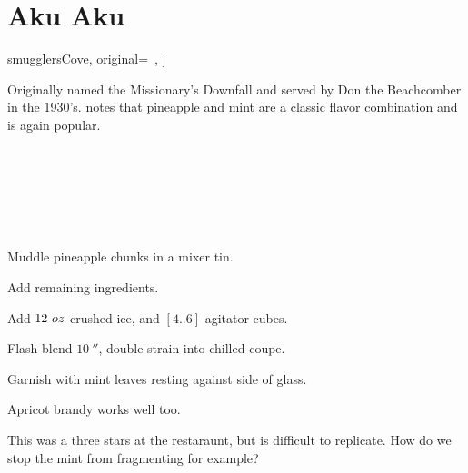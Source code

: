 \section[Aku Aku]{Aku Aku}


\begin{recipestats}[
	servings=1,
	preptime=5~\minute,
	source=\citeauthor{smugglersCove}~\cite[p.~39]{smugglersCove},
	original=\citeauthor{traderVicsGuide}~\cite{traderVicsGuide},
]
\end{recipestats}

\begin{recipeabstract}
	Originally named the Missionary's Downfall and served by Don the Beachcomber in the 1930's\cite{smugglersCove}.
	\citeauthor{smugglersCove} notes that pineapple and mint are a classic flavor combination and is again popular.
\end{recipeabstract}


\begin{ingredientcolumns}[1]
	\begin{ingredientblock}
		\\
		\\
		\\
		\\
		\\
	\end{ingredientblock}
\end{ingredientcolumns}

\begin{preparation}
	\item Muddle pineapple chunks in a mixer tin.
	\item Add remaining ingredients.
	\item Add $12~oz$ crushed ice, and $[4..6]$ agitator cubes.
	\item Flash blend $10~\second$, double strain into chilled coupe.
	\item Garnish with mint leaves resting against side of glass.
\end{preparation}


\begin{variation}
	\item Apricot brandy works well too.
\end{variation}

\begin{experiments}
	\item This was a three stars at the restaraunt, but is difficult to replicate.
		How do we stop the mint from fragmenting for example?
\end{experiments}


\recipeend%
